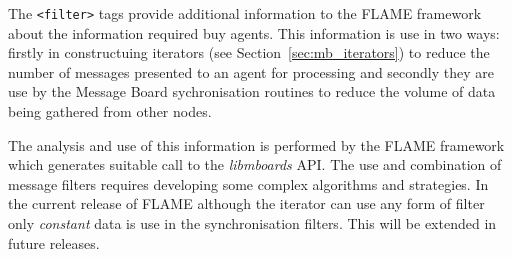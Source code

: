 The \texttt{<filter>} tags provide additional information to the FLAME framework about the information required buy agents. This information is use in two ways: firstly in constructuing iterators (see Section~\ref{sec:mb_iterators}) to reduce the number of messages presented to an agent for processing and secondly they are use by the Message Board sychronisation routines to reduce the volume of data being gathered from other nodes.

The analysis and use of this information is performed by the FLAME framework which generates suitable call to the \textit{libmboards} API. The use and combination of message filters  requires developing some complex algorithms and strategies. In the current release of FLAME although the iterator can use any form of filter only \textit{constant} data is use in the synchronisation filters. This will be extended in future releases.


